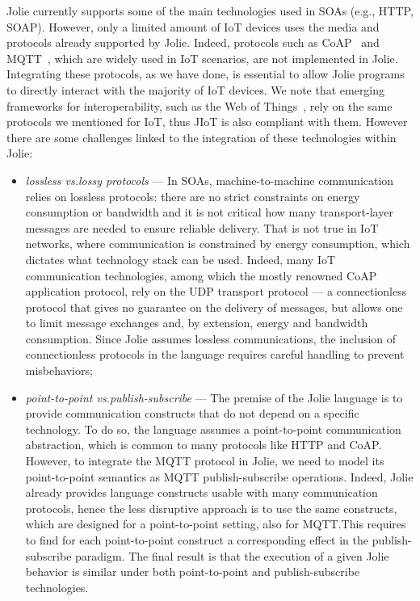 Jolie currently supports some of the main technologies used in SOAs (e.g.,
HTTP, SOAP). However, only a limited amount of IoT devices uses the media and
protocols already supported by Jolie. Indeed, protocols such as
CoAP~\cite{doi:10.17487/RFC7252,coap} and MQTT~\cite{mqtt-v3.1.1,mqtt}, which
are widely used in IoT scenarios, are not implemented in Jolie. Integrating
these protocols, as we have done, is essential to allow Jolie programs to
directly interact with the majority of IoT devices. We note that emerging
frameworks for interoperability, such as the Web of Things~\cite{w3c17}, rely
on the same protocols we mentioned for IoT, thus JIoT is also compliant with
them.
%
However there are some
challenges linked to the integration of these technologies within Jolie:

\begin{itemize}
  \item \textit{lossless vs.\@ lossy protocols} --- In SOAs,
  machine-to-machine communication relies on lossless protocols: there are no
  strict constraints on energy consumption or bandwidth and it is not critical
  how many transport-layer messages are needed to ensure reliable delivery.
  That is not true in IoT networks, where communication is constrained by
  energy consumption, which dictates what technology stack can be used. Indeed,
  many IoT communication technologies, among which the mostly renowned CoAP
  application protocol, rely on the UDP transport protocol --- a connectionless
  protocol that gives no guarantee on the delivery of messages, but allows one
  to limit message exchanges and, by extension, energy and bandwidth
  consumption. Since Jolie assumes lossless communications, the inclusion of
  connectionless protocols in the language requires careful handling to prevent
  misbehaviors;

  \item \textit{point-to-point vs.\@ publish-subscribe} --- The premise of the
  Jolie language is to provide communication constructs that do not depend on a
  specific technology. To do so, the language assumes a point-to-point
  communication abstraction, which is common to many protocols like HTTP and
  CoAP. However, to integrate the MQTT protocol in Jolie, we need to model its
  point-to-point semantics as MQTT publish-subscribe operations. Indeed, Jolie
  already provides language constructs usable with many communication
  protocols, hence the less disruptive approach is to use the same constructs,
  which are designed for a point-to-point setting, also for MQTT.\@ This
  requires to find for each point-to-point construct a corresponding effect in
  the publish-subscribe paradigm. The final result is that the execution of a given Jolie behavior is similar under both point-to-point and publish-subscribe technologies.
  
\end{itemize} 